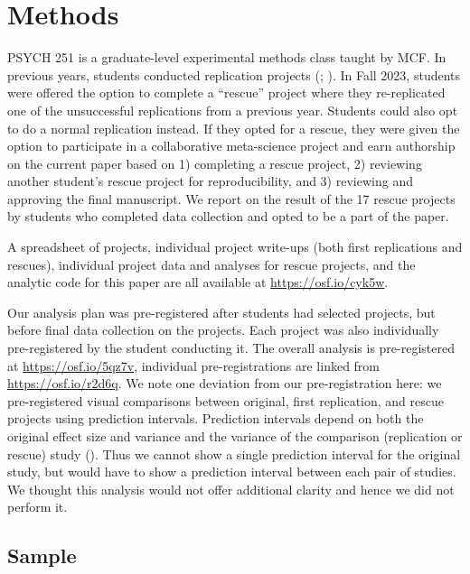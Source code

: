 \documentclass[
  english,
  a4paper,
]{article}
\begin{document}
\section{Methods}\label{methods}

PSYCH 251 is a graduate-level experimental methods class taught by MCF.
In previous years, students conducted replication projects (; ).
In Fall 2023, students were offered the option to complete a ``rescue'' project where they re-replicated one of the unsuccessful replications from a previous year.
Students could also opt to do a normal replication instead.
If they opted for a rescue, they were given the option to participate in a collaborative meta-science project and earn authorship on the current paper based on 1) completing a rescue project, 2) reviewing another student's rescue project for reproducibility, and 3) reviewing and approving the final manuscript.
We report on the result of the 17 rescue projects by students who completed data collection and opted to be a part of the paper.

A spreadsheet of projects, individual project write-ups (both first replications and rescues), individual project data and analyses for rescue projects, and the analytic code for this paper are all available at \url{https://osf.io/cyk5w}.

Our analysis plan was pre-registered after students had selected projects, but before final data collection on the projects.
Each project was also individually pre-registered by the student conducting it.
The overall analysis is pre-registered at \url{https://osf.io/5qz7v}, individual pre-registrations are linked from \url{https://osf.io/r2d6q}.
We note one deviation from our pre-registration here: we pre-registered visual comparisons between original, first replication, and rescue projects using prediction intervals.
Prediction intervals depend on both the original effect size and variance and the variance of the comparison (replication or rescue) study ().
Thus we cannot show a single prediction interval for the original study, but would have to show a prediction interval between each pair of studies.
We thought this analysis would not offer additional clarity and hence we did not perform it.

\subsection{Sample}\label{sample}
\end{document}
